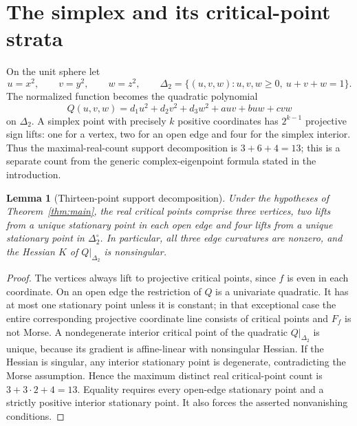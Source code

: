 \documentclass[10pt,a4paper]{article}
\theoremstyle{plain}
\newtheorem{lemma}[theorem]{Lemma}
\theoremstyle{remark}
\begin{document}
\section{The simplex and its critical-point strata}
On the unit sphere let
\[
 u=x^2,\qquad v=y^2,\qquad w=z^2,\qquad
 \Delta_2=\{(u,v,w):u,v,w\ge0,\ u+v+w=1\}.
\]
The normalized function becomes the quadratic polynomial
\begin{equation}\label{eq:Q}
 Q(u,v,w)=d_1u^2+d_2v^2+d_3w^2+auv+buw+cvw
\end{equation}
on $\Delta_2$. A simplex point with precisely $k$ positive coordinates has $2^{k-1}$ projective sign lifts: one for a vertex, two for an open edge and four for the simplex interior. Thus the maximal-real-count support decomposition is $3+6+4=13$; this is a separate count from the generic complex-eigenpoint formula stated in the introduction.

\begin{lemma}[Thirteen-point support decomposition]\label{lem:support}
Under the hypotheses of Theorem~\ref{thm:main}, the real critical points comprise three vertices, two lifts from a unique stationary point in each open edge and four lifts from a unique stationary point in $\Delta_2^\circ$. In particular, all three edge curvatures are nonzero, and the Hessian $K$ of $Q|_{\Delta_2}$ is nonsingular.
\end{lemma}
\begin{proof}
The vertices always lift to projective critical points, since $f$ is even in each coordinate. On an open edge the restriction of $Q$ is a univariate quadratic. It has at most one stationary point unless it is constant; in that exceptional case the entire corresponding projective coordinate line consists of critical points and $F_f$ is not Morse. A nondegenerate interior critical point of the quadratic $Q|_{\Delta_2}$ is unique, because its gradient is affine-linear with nonsingular Hessian. If the Hessian is singular, any interior stationary point is degenerate, contradicting the Morse assumption. Hence the maximum distinct real critical-point count is $3+3\cdot2+4=13$. Equality requires every open-edge stationary point and a strictly positive interior stationary point. It also forces the asserted nonvanishing conditions.
\end{proof}
\end{document}
